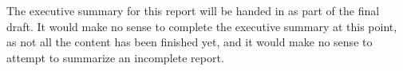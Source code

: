 The executive summary for this report will be handed in as part of the final draft. It would
make no sense to complete the executive summary at this point, as not all the content has been
finished yet, and it would make no sense to attempt to summarize an incomplete report.